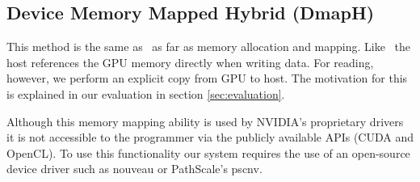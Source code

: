 \subsection{Device Memory Mapped Hybrid (DmapH)}
This method is the same as \dm\ as far as memory allocation and mapping. Like \dm\, the host references the GPU memory directly when writing data. For reading, however, we perform an explicit copy from GPU to host. The motivation for this is explained in our evaluation in section \ref{sec:evaluation}.

Although this memory mapping ability is used by NVIDIA's proprietary drivers it is not accessible to the programmer via the publicly available APIs (CUDA and OpenCL). To use this functionality our system requires the use of an open-source device driver such as nouveau or PathScale's pscnv\cite{ENZO}. 
%


